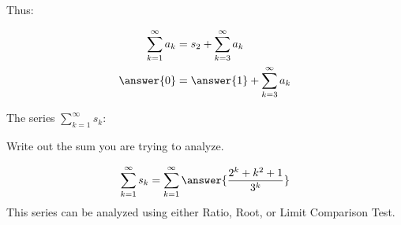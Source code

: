 \documentclass{ximera}
\begin{document}
\begin{exercise}
\begin{exercise}
\begin{exercise}
\begin{exercise}
Thus:

\begin{align*}
\sum_{k=1}^{\infty} a_k &= s_2 + \sum_{k=3}^{\infty} a_k \\
\answer{0} &= \answer{1} + \sum_{k=3}^{\infty} a_k
\end{align*}

\begin{exercise}
The series $\sum_{k=1}^{\infty} s_k$: 

\begin{multipleChoice}
\end{multipleChoice}

\begin{hint}
Write out the sum you are trying to analyze.

\[
\sum_{k=1}^{\infty} s_k = \sum_{k=1}^{\infty} \answer{\frac{2^k+k^2+1}{3^k}}
\]
This series can be analyzed using either Ratio, Root, or Limit Comparison Test.

\end{hint}
\end{exercise}
\end{exercise}
\end{exercise}
\end{exercise}
\end{exercise}
\end{document}
